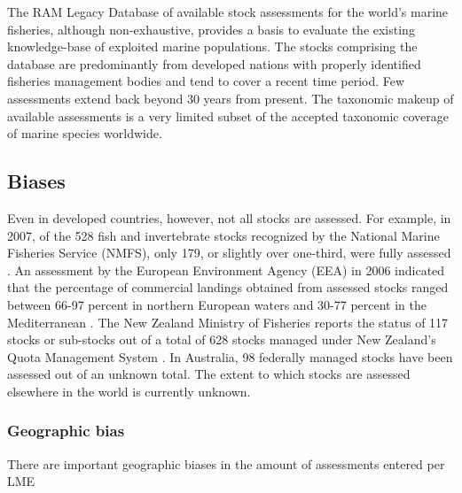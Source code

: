 The RAM Legacy Database of available stock assessments for the world's
marine fisheries, although non-exhaustive, provides a basis to
evaluate the existing knowledge-base of exploited marine populations.
The stocks comprising the database are predominantly from developed
nations with properly identified fisheries management bodies and tend
to cover a recent time period. Few assessments extend back beyond 30
years from present. The taxonomic makeup of available assessments is a
very limited subset of the accepted taxonomic coverage of marine
species worldwide.

\subsection*{Biases}

Even in developed countries, however, not all stocks are assessed.
For example, in 2007, of the 528 fish and invertebrate stocks
recognized by the National Marine Fisheries Service (NMFS), only 179,
or slightly over one-third, were fully assessed
\citep{NMFS:2008:status}.  An assessment by the European Environment
Agency (EEA) in 2006 indicated that the percentage of commercial
landings obtained from assessed stocks ranged between 66-97 percent in
northern European waters and 30-77 percent in the Mediterranean
\citep{eea:2009:status}.  The New Zealand Ministry of Fisheries
reports the status of 117 stocks or sub-stocks out of a total of 628
stocks managed under New Zealand's Quota Management System
\citep{NZMF:2009}.  In Australia, 98 federally managed stocks have
been assessed \citep{Wilson:etal:2009:status} out of an unknown total.
The extent to which stocks are assessed elsewhere in the world is
currently unknown.


\subsubsection*{Geographic bias}

There are important geographic biases in the amount of assessments entered per LME

